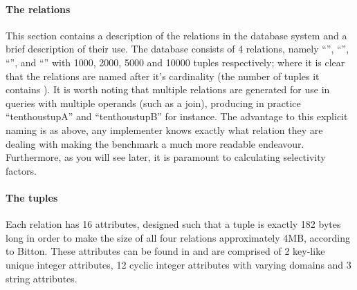 \paragraph{The relations} This section contains a description of the relations in
the database system and a brief description of their use. The database consists
of 4 relations, namely ``'', ``'',
``'', and ``'' with 1000, 2000, 5000
and 10000 tuples respectively; where it is
clear that the relations are named after it's cardinality (the number of tuples
it contains \cite{PractitionersIntroduction}). It is worth noting that multiple
relations are generated for use in 
queries with multiple operands (such as a join), producing in practice
``tenthoustupA'' and ``tenthoustupB'' for instance. The advantage to this explicit
naming is as above, any implementer knows exactly what relation they are dealing
with making the benchmark a much more readable endeavour. Furthermore, as you will
see later, it is paramount to calculating selectivity factors.

\paragraph{The tuples} Each relation has 16 attributes, designed such that a
tuple is exactly 182 bytes long in order to make the size of all four relations
approximately 4MB, according to Bitton. These attributes can be found in
 and are comprised of 2 key-like unique integer
attributes, 12 cyclic integer attributes with varying domains and 3 string attributes.

